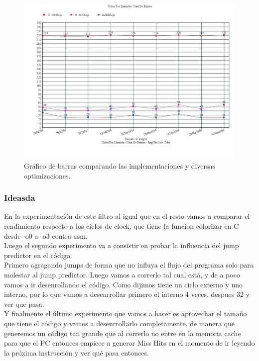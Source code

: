 \medskip\begin{figure}[h!]
\centering
\captionsetup{justification=centering}
	\includegraphics[width = 15 cm, height = 8 cm]{imagenes/mismoColor.jpg}
	\caption[center]{Gráfico de barras comparando las implementaciones y diversas optimizaciones.}
\end{figure}

\medskip

	

\subsubsection{Ideasda}	En la experimentación de este filtro al igual que en el resto vamos a comparar el rendimiento respecto a los ciclos de clock, que tiene la funcion colorizar en C desde -o0 a -o3 contra asm. \\ Luego el segundo experimento va a consistir en probar la influencia del jump predictor en el código.\\ Primero agragando jumps de forma que no influya el flujo del programa solo para molestar al jump predictor.  Luego vamos a correrlo tal cual está, y de a poco vamos a ir desenrollando el código. Como dijimos tiene un ciclo externo y uno interno, por lo que vamos a desenrrollar primero el interno 4 veces, despues 32 y ver que pasa.\\
Y finalmente el último experimento que vamos a hacer es aprovechar el tamaño que tiene el código y vamos a desenrrollarlo completamente, de manera que generemos un código tan grande que al correrlo no entre en la memoria cache para que el PC entonces empiece a generar Miss Hits en el momento de ir leyendo la próxima instrucción y ver qué pasa entonces.
	   

